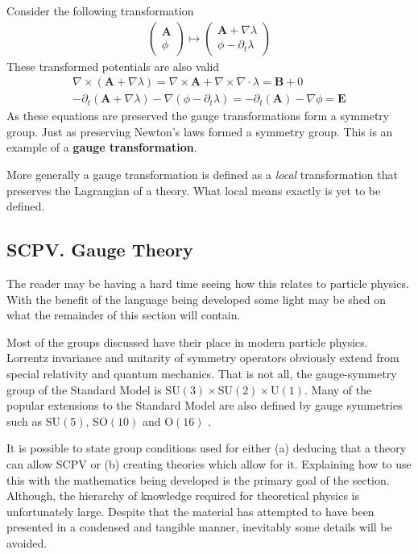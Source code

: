 Consider the following transformation
\begin{align*}
\left( \begin{array}{l}
\mathbf{A} \\ \phi
\end{array} \right) \mapsto
\left( \begin{array}{l}
\mathbf{A}+\nabla \lambda \\
\phi - \partial_t \lambda
\end{array} \right)
\end{align*}
These transformed potentials are also valid
\begin{align*}
\nabla \times (\mathbf{A}+\nabla \lambda) = \nabla\times \mathbf{A} + \nabla \times \nabla \cdot \lambda  = \mathbf{B} + 0 \\
-\partial_t(\mathbf{A}+\nabla \lambda)-\nabla (\phi - \partial_t \lambda) = -\partial_t(\mathbf{A})-\nabla \phi = \mathbf{E}
\end{align*}
As these equations are preserved the gauge transformations form a symmetry group. Just as preserving Newton's laws formed a symmetry group. This is an example of a \textbf{gauge transformation}.

More generally a gauge transformation is defined as a \textit{local} transformation that preserves the Lagrangian of a theory. What local means exactly is yet to be defined.

\subsection{SCPV. Gauge Theory}

The reader may be having a hard time seeing how this relates to particle physics. With the benefit of the language being developed some light may be shed on what the remainder of this section will contain.

Most of the groups discussed have their place in modern particle physics. Lorrentz invariance and unitarity of symmetry operators obviously extend from special relativity and quantum mechanics. That is not all, the gauge-symmetry group of the Standard Model is $\mathrm{SU}(3)\times \mathrm{SU}(2)\times \mathrm{U}(1)$. Many of the popular extensions to the Standard Model are also defined by gauge symmetries such as $\mathrm{SU}(5)$, $\mathrm{SO}(10)$ and $\mathrm{O}(16)$ \cite{SCPV4}.

It is possible to state group conditions used for either (a) deducing that a theory can allow SCPV or (b) creating theories which allow for it\cite{SCPVgroups}. Explaining how to use this with the mathematics being developed is the primary goal of the section. Although, the hierarchy of knowledge required for theoretical physics is unfortunately large. Despite that the material has attempted to have been presented in a condensed and tangible manner, inevitably some details will be avoided.


